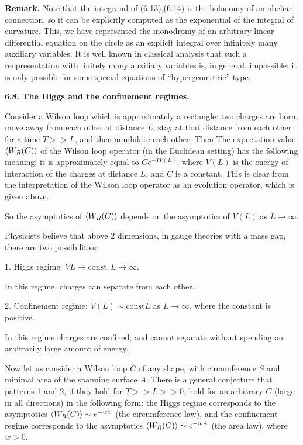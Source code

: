  {\bf Remark.} 
Note that the integrand of (6.13),(6.14) is the holonomy of an abelian 
connection, so it can be explicitly computed as the exponential 
of the integral of curvature. This, we have represented the monodromy 
of an arbitrary linear differential equation on the circle 
as an explicit integral over infinitely many auxiliary 
variables. It is well known in classical analysis 
that such a reopresentation with finitely many auxiliary variables
is, in general, impossible: it is only possible for some special 
equations of ``hypergeometric'' type. 

{\bf 6.8. The Higgs and the confinement regimes.} 

Consider a Wilson loop which is approximately a rectangle: 
two charges are born, move away from each other at distance $L$, 
stay at that distance from each other for a time $T>>L$, and then 
annihilate each other. Then 
The expectation value $\langle W_R(C)\rangle$ of the Wilson loop operator 
(in the Euclidean setting) has the following meaning: it is approximately 
equal to $Ce^{-TV(L)}$, 
where $V(L)$ is the energy of interaction of the charges
at distance $L$, and $C$ is a constant. 
This is clear from the interpretation of the Wilson 
loop operator as an evolution operator, which is given above. 

So the asymptotics of $\langle W_R(C)\rangle$ depends on the asymptotics 
of $V(L)$ as $L\to \infty$. 

Physicists believe that above 2 dimensions, in gauge theories 
with a mass gap, there are
two possibilities:

1. Higgs regime: $V{L}\to \text{const}, L\to \infty$.

In this regime, charges can separate from each other. 

2. Confinement regime: $V(L)\sim \text{const}L$ as $L\to \infty$,
where the constant is positive. 

In this regime charges are confined, and cannot separate without 
spending an arbitrarily large amount of energy. 

Now let us consider a Wilson loop $C$ of any shape, with circumference $S$ and 
minimal area of the spanning surface $A$. 
There is a general conjecture that patterns 1 and 2, if they hold
for $T>>L>>0$, hold for an arbitrary $C$ (large in all directions) 
in the following form:
the Higgs regime corresponds
to the asymptotics
$\langle W_R(C)\rangle\sim e^{-wS}$ (the circumference law), 
and the confinement regime corresponds
to the asymptotics $\langle W_R(C)\rangle\sim e^{-wA}$ (the area law), where $w>0$. 

